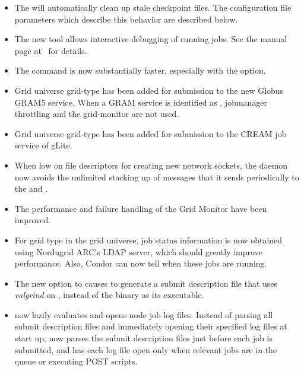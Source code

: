 \begin{itemize}

\item The  will automatically clean up stale
checkpoint files. The configuration file parameters which describe this
behavior are described below.

\item The new  tool allows interactive debugging of running
jobs.  See the manual page at~\pageref{man-condor-ssh-to-job} for details.

\item The  command is now substantially faster, 
especially with the  option.

\item Grid universe grid-type  has been added for submission to
the new Globus GRAM5 service. When a GRAM service is identified as
, jobmanager throttling and the grid-monitor are not used.

\item Grid universe grid-type  has been added for submission
to the CREAM job service of gLite.

\item When low on file descriptors for creating new network sockets,
the  daemon now avoids the unlimited stacking up of
messages that it sends periodically to the  
and .

\item The performance and failure handling of the Grid Monitor have been
improved.

\item For grid type  in the grid universe,
job status information
is now obtained using Nordugrid ARC's LDAP server, which should greatly
improve performance. Also, Condor can now tell when these jobs are running.

\item The new  option to 
causes  to generate a submit description file that
uses \emph{valgrind} on , instead of the 
binary as its executable.

\item {} now lazily evaluates and opens node job log files.
Instead of parsing all submit description files and 
immediately opening their specified log files at start up,
 now parses
the submit description files just before each job is submitted,
and has each log file open only when relevant jobs are in the queue
or executing POST scripts.


\end{itemize}
